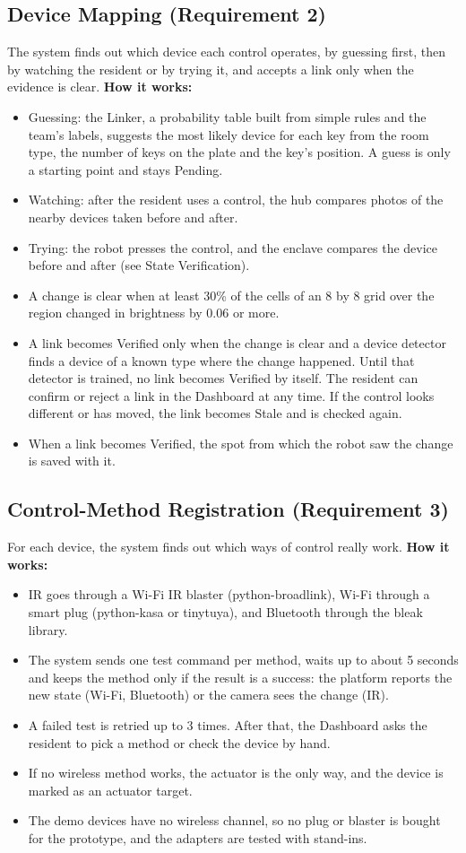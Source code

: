 \documentclass[conference]{IEEEtran}
\begin{document}
\subsection{Device Mapping (Requirement 2)}
The system finds out which device each control operates, by guessing first, then by watching the resident or by trying it, and accepts a link only when the evidence is clear.
\textbf{How it works:}
\begin{itemize}
\item Guessing: the Linker, a probability table built from simple rules and the team's labels, suggests the most likely device for each key from the room type, the number of keys on the plate and the key's position. A guess is only a starting point and stays Pending.
\item Watching: after the resident uses a control, the hub compares photos of the nearby devices taken before and after.
\item Trying: the robot presses the control, and the enclave compares the device before and after (see State Verification).
\item A change is clear when at least 30\% of the cells of an 8 by 8 grid over the region changed in brightness by 0.06 or more.
\item A link becomes Verified only when the change is clear and a device detector finds a device of a known type where the change happened. Until that detector is trained, no link becomes Verified by itself. The resident can confirm or reject a link in the Dashboard at any time. If the control looks different or has moved, the link becomes Stale and is checked again.
\item When a link becomes Verified, the spot from which the robot saw the change is saved with it.
\end{itemize}

\subsection{Control-Method Registration (Requirement 3)}
For each device, the system finds out which ways of control really work.
\textbf{How it works:}
\begin{itemize}
\item IR goes through a Wi-Fi IR blaster (python-broadlink), Wi-Fi through a smart plug (python-kasa or tinytuya), and Bluetooth through the bleak library.
\item The system sends one test command per method, waits up to about 5 seconds and keeps the method only if the result is a success: the platform reports the new state (Wi-Fi, Bluetooth) or the camera sees the change (IR).
\item A failed test is retried up to 3 times. After that, the Dashboard asks the resident to pick a method or check the device by hand.
\item If no wireless method works, the actuator is the only way, and the device is marked as an actuator target.
\item The demo devices have no wireless channel, so no plug or blaster is bought for the prototype, and the adapters are tested with stand-ins.
\end{itemize}
\end{document}
